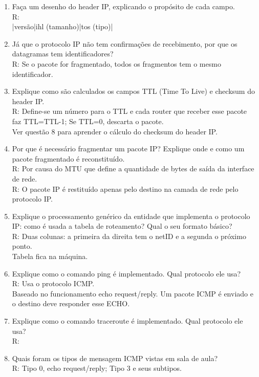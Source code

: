 \documentclass{article}
\begin{document}
\begin{enumerate}
	\item Faça um desenho do header IP, explicando o propósito de cada campo.
	\\R:
	\\|versão|ihl (tamanho)|tos (tipo)|

	\item Já que o protocolo IP não tem confirmações de recebimento, por que os
datagramas tem identificadores?\\
	R: Se o pacote for fragmentado, todos os fragmentos tem o mesmo identificador.

	\item Explique como são calculados os campos TTL (Time To Live) e checksum do header IP.
	\\R: Define-se um número para o TTL e cada router que receber esse pacote faz TTL=TTL-1; Se TTL=0, descarta o pacote.
	\\Ver questão 8 para aprender o cálculo do checksum do header IP.

	\item Por que é necessário fragmentar um pacote IP? Explique onde e como um pacote fragmentado é reconstituído.
	\\R: Por causa do MTU que define a quantidade de bytes de saída da interface de rede.
	\\R: O pacote IP é restituído apenas pelo destino na camada de rede pelo protocolo IP.

	\item Explique o processamento genérico da entidade que implementa o protocolo IP: como é usada a tabela de roteamento? Qual o seu formato básico?
	\\R: Duas colunas: a primeira da direita tem o netID e a segunda o próximo ponto.
	\\Tabela fica na máquina. 

	\item Explique como o comando ping é implementado. Qual protocolo ele usa?
	\\R: Usa o protocolo ICMP.
	\\Baseado no funcionamento echo request/reply. Um pacote ICMP é enviado e o destino deve responder esse ECHO.

	\item Explique como o comando traceroute é implementado. Qual protocolo ele usa?
	\\R:

	\item Quais foram os tipos de mensagem ICMP vistas em sala de aula?
	\\R: Tipo 0, echo request/reply; Tipo 3 e seus subtipos.


\end{enumerate}
\end{document}
